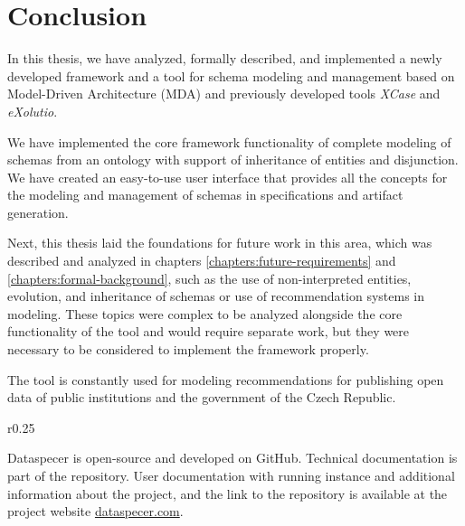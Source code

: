\chapter*{Conclusion}

In this thesis, we have analyzed, formally described, and implemented a newly developed framework and a tool for schema modeling and management based on Model-Driven Architecture (MDA) and previously developed tools \textit{XCase} and \textit{eXolutio}.

We have implemented the core framework functionality of complete modeling of schemas from an ontology with support of inheritance of entities and disjunction. We have created an easy-to-use user interface that provides all the concepts for the modeling and management of schemas in specifications and artifact generation.

Next, this thesis laid the foundations for future work in this area, which was described and analyzed in chapters \ref{chapters:future-requirements} and \ref{chapters:formal-background}, such as the use of non-interpreted entities, evolution, and inheritance of schemas or use of recommendation systems in modeling. These topics were complex to be analyzed alongside the core functionality of the tool and would require separate work, but they were necessary to be considered to implement the framework properly.

The tool is constantly used for modeling recommendations for publishing open data of public institutions and the government of the Czech Republic.

\bigskip

\begin{wrapfigure}{r}{0.25\textwidth}
    \centering
    \vspace{-\intextsep}
    \hspace*{-.75\columnsep}
\end{wrapfigure}
Dataspecer is open-source and developed on GitHub. Technical documentation is part of the repository. User documentation with running instance and additional information about the project, and the link to the repository is available at the project website \url{dataspecer.com}.

\vfill
